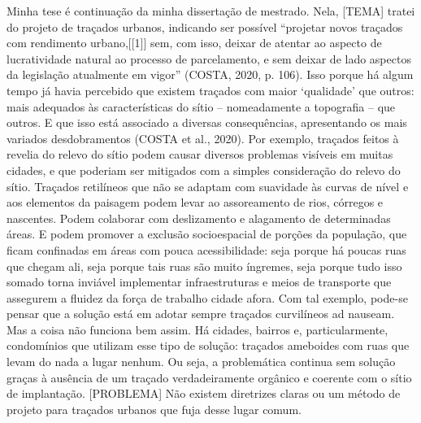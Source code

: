 \documentclass[]{report}
\begin{document}
	Minha tese é continuação da minha dissertação de mestrado. Nela, [TEMA] tratei do projeto de traçados urbanos, indicando ser possível “projetar novos traçados com rendimento urbano,[[1]] sem, com isso, deixar de atentar ao aspecto de lucratividade natural ao processo de parcelamento, e sem deixar de lado aspectos da legislação atualmente em vigor” (COSTA, 2020, p. 106). Isso porque há algum tempo já havia percebido que existem traçados com maior ‘qualidade’ que outros: mais adequados às características do sítio – nomeadamente a topografia – que outros. E que isso está associado a diversas consequências, apresentando os mais variados desdobramentos (COSTA et al., 2020). Por exemplo, traçados feitos à revelia do relevo do sítio podem causar diversos problemas visíveis em muitas cidades, e que poderiam ser mitigados com a simples consideração do relevo do sítio. Traçados retilíneos que não se adaptam com suavidade às curvas de nível e aos elementos da paisagem podem levar ao assoreamento de rios, córregos e nascentes. Podem colaborar com deslizamento e alagamento de determinadas áreas. E podem promover a exclusão socioespacial de porções da população, que ficam confinadas em áreas com pouca acessibilidade: seja porque há poucas ruas que chegam ali, seja porque tais ruas são muito íngremes, seja porque tudo isso somado torna inviável implementar infraestruturas e meios de transporte que assegurem a fluidez da força de trabalho cidade afora. Com tal exemplo, pode-se pensar que a solução está em adotar sempre traçados curvilíneos ad nauseam. Mas a coisa não funciona bem assim. Há cidades, bairros e, particularmente, condomínios que utilizam esse tipo de solução: traçados ameboides com ruas que levam do nada a lugar nenhum. Ou seja, a problemática continua sem solução graças à ausência de um traçado verdadeiramente orgânico e coerente com o sítio de implantação. [PROBLEMA] Não existem diretrizes claras ou um método de projeto para traçados urbanos que fuja desse lugar comum.
\end{document}
